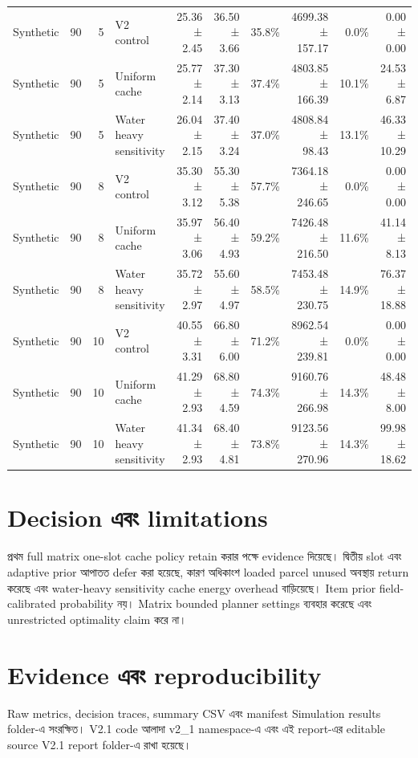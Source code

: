\documentclass[10pt,a4paper]{article}
\begin{document}
\begin{landscape}
\begin{longtable}{@{}llrlrrrrrr@{}}
Synthetic & 90 & 5 & V2 control & 25.36 ± 2.45 & 36.50 ± 3.66 & 35.8\% & 4699.38 ± 157.17 & 0.0\% & 0.00 ± 0.00 \\
Synthetic & 90 & 5 & Uniform cache & 25.77 ± 2.14 & 37.30 ± 3.13 & 37.4\% & 4803.85 ± 166.39 & 10.1\% & 24.53 ± 6.87 \\
Synthetic & 90 & 5 & Water heavy sensitivity & 26.04 ± 2.15 & 37.40 ± 3.24 & 37.0\% & 4808.84 ± 98.43 & 13.1\% & 46.33 ± 10.29 \\
Synthetic & 90 & 8 & V2 control & 35.30 ± 3.12 & 55.30 ± 5.38 & 57.7\% & 7364.18 ± 246.65 & 0.0\% & 0.00 ± 0.00 \\
Synthetic & 90 & 8 & Uniform cache & 35.97 ± 3.06 & 56.40 ± 4.93 & 59.2\% & 7426.48 ± 216.50 & 11.6\% & 41.14 ± 8.13 \\
Synthetic & 90 & 8 & Water heavy sensitivity & 35.72 ± 2.97 & 55.60 ± 4.97 & 58.5\% & 7453.48 ± 230.75 & 14.9\% & 76.37 ± 18.88 \\
Synthetic & 90 & 10 & V2 control & 40.55 ± 3.31 & 66.80 ± 6.00 & 71.2\% & 8962.54 ± 239.81 & 0.0\% & 0.00 ± 0.00 \\
Synthetic & 90 & 10 & Uniform cache & 41.29 ± 2.93 & 68.80 ± 4.59 & 74.3\% & 9160.76 ± 266.98 & 14.3\% & 48.48 ± 8.00 \\
Synthetic & 90 & 10 & Water heavy sensitivity & 41.34 ± 2.93 & 68.40 ± 4.81 & 73.8\% & 9123.56 ± 270.96 & 14.3\% & 99.98 ± 18.62 \\
\bottomrule
\end{longtable}
\end{landscape}
\section{Decision এবং limitations}
প্রথম full matrix one-slot cache policy retain করার পক্ষে evidence দিয়েছে। দ্বিতীয় slot এবং adaptive prior আপাতত defer করা হয়েছে, কারণ অধিকাংশ loaded parcel unused অবস্থায় return করেছে এবং water-heavy sensitivity cache energy overhead বাড়িয়েছে। Item prior field-calibrated probability নয়। Matrix bounded planner settings ব্যবহার করেছে এবং unrestricted optimality claim করে না।
\section{Evidence এবং reproducibility}
Raw metrics, decision traces, summary CSV এবং manifest Simulation results folder-এ সংরক্ষিত। V2.1 code আলাদা v2\_1 namespace-এ এবং এই report-এর editable source V2.1 report folder-এ রাখা হয়েছে।
\end{document}

